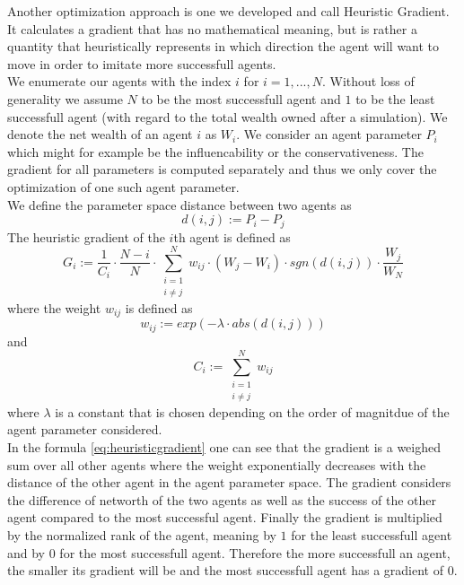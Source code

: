 \documentclass[11pt]{article}
\begin{document}
Another optimization approach is one we developed and call Heuristic Gradient. It calculates a gradient that has no mathematical meaning, but is rather a quantity that heuristically represents in which direction the agent will want to move in order to imitate more successfull agents. \\
We enumerate our agents with the index $i$ for $i=1,...,N$. Without loss of generality we assume $N$ to be the most successfull agent and $1$ to be the least successfull agent (with regard to the total wealth owned after a simulation). We denote the net wealth of an agent $i$ as $W_i$. We consider an agent parameter $P_i$ which might for example be the influencability or the conservativeness. The gradient for all parameters is computed separately and thus we only cover the optimization of one such agent parameter. \\
We define the parameter space distance between two agents as
\begin{equation}
  d(i,j):=P_i-P_j
\end{equation}
The heuristic gradient of the $i$th agent is defined as \\
\begin{equation}\label{eq:heuristicgradient}
  G_i:=\frac{1}{C_i}\cdot \frac{N-i}{N} \cdot \sum\limits_{\substack{i=1 \\ i\neq j}}^{N}{ w_{ij} \cdot (W_j - W_i) \cdot sgn(d(i,j)) \cdot \frac{W_j}{W_N} }
\end{equation}
where the weight $w_{ij}$ is defined as
\begin{equation}
  w_{ij}:=exp(-\lambda \cdot abs(d(i,j)))
\end{equation}
and
\begin{equation}
  C_i:=\sum\limits_{\substack{i=1 \\ i\neq j}}^{N}{w_{ij}}
\end{equation}
where $\lambda$ is a constant that is chosen depending on the order of magnitdue of the agent parameter considered. \\
In the formula \ref{eq:heuristicgradient} one can see that the gradient is a weighed sum over all other agents where the weight exponentially decreases with the distance of the other agent in the agent parameter space. The gradient considers the difference of networth of the two agents as well as the success of the other agent compared to the most successful agent. Finally the gradient is multiplied by the normalized rank of the agent, meaning by $1$ for the least successfull agent and by $0$ for the most successfull agent. Therefore the more successfull an agent, the smaller its gradient will be and the most successfull agent has a gradient of $0$. \\
\end{document}
